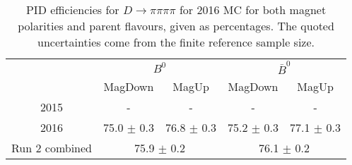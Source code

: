 \begin{table}
    \centering
    \begin{tabular}{ccccc}
        \toprule
        & \multicolumn{2}{c}{$B^0$} &  \multicolumn{2}{c}{$\bar{B}^0$}\\
        & MagDown & MagUp & MagDown & MagUp\\
        \midrule
2015 & - & - & - & - \\
2016 & 75.0 $\pm$ 0.3 & 76.8 $\pm$ 0.3 & 75.2 $\pm$ 0.3 & 77.1 $\pm$ 0.3 \\
        \midrule
Run 2 combined & \multicolumn{2}{c}{75.9 $\pm$ 0.2} & \multicolumn{2}{c}{76.1 $\pm$ 0.2} \\
        \bottomrule
    \end{tabular}
    \caption{PID efficiencies for $D \to \pi\pi\pi\pi$ for 2016 MC for both magnet polarities and parent flavours, given as percentages. The quoted  uncertainties come from the finite reference sample size.}
\label{tab:PID_efficiency_pipipipi}
\end{table}
